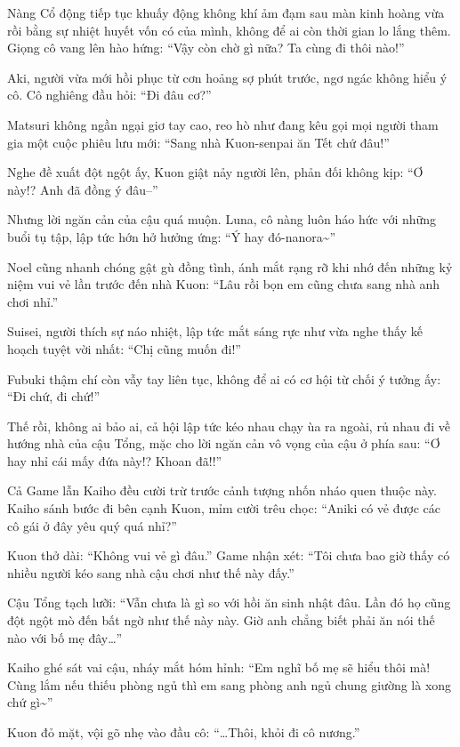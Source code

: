 \documentclass[../main.tex]{subfiles}
\begin{document}
Nàng Cổ động tiếp tục khuấy động không khí ảm đạm sau màn kinh hoàng vừa rồi bằng sự nhiệt huyết vốn có của mình, không để ai còn thời gian lo lắng thêm. Giọng cô vang lên hào hứng: ``Vậy còn chờ gì nữa? Ta cùng đi thôi nào!''

Aki, người vừa mới hồi phục từ cơn hoảng sợ phút trước, ngơ ngác không hiểu ý cô. Cô nghiêng đầu hỏi: ``Đi đâu cơ?''

Matsuri không ngần ngại giơ tay cao, reo hò như đang kêu gọi mọi người tham gia một cuộc phiêu lưu mới: ``Sang nhà Kuon-senpai ăn Tết chứ đâu!''

Nghe đề xuất đột ngột ấy, Kuon giật nảy người lên, phản đối không kịp: ``Ơ này!? Anh đã đồng ý đâu--''

Nhưng lời ngăn cản của cậu quá muộn. Luna, cô nàng luôn háo hức với những buổi tụ tập, lập tức hớn hở hưởng ứng: ``Ý hay đó-nanora\~{}''

Noel cũng nhanh chóng gật gù đồng tình, ánh mắt rạng rỡ khi nhớ đến những kỷ niệm vui vẻ lần trước đến nhà Kuon: ``Lâu rồi bọn em cũng chưa sang nhà anh chơi nhỉ.''

Suisei, người thích sự náo nhiệt, lập tức mắt sáng rực như vừa nghe thấy kế hoạch tuyệt vời nhất: ``Chị cũng muốn đi!''

Fubuki thậm chí còn vẫy tay liên tục, không để ai có cơ hội từ chối ý tưởng ấy: ``Đi chứ, đi chứ!''

Thế rồi, không ai bảo ai, cả hội lập tức kéo nhau chạy ùa ra ngoài, rủ nhau đi về hướng nhà của cậu Tổng, mặc cho lời ngăn cản vô vọng của cậu ở phía sau: ``Ơ hay nhỉ cái mấy đứa này!? Khoan đã!!''

Cả Game lẫn Kaiho đều cười trừ trước cảnh tượng nhốn nháo quen thuộc này. Kaiho sánh bước đi bên cạnh Kuon, mỉm cười trêu chọc: ``Aniki có vẻ được các cô gái ở đây yêu quý quá nhỉ?''

Kuon thở dài: ``Không vui vẻ gì đâu.'' Game nhận xét: ``Tôi chưa bao giờ thấy có nhiều người kéo sang nhà cậu chơi như thế này đấy.''

Cậu Tổng tạch lưỡi: ``Vẫn chưa là gì so với hồi ăn sinh nhật đâu. Lần đó họ cũng đột ngột mò đến bất ngờ như thế này này. Giờ anh chẳng biết phải ăn nói thế nào với bố mẹ đây\dots''

Kaiho ghé sát vai cậu, nháy mắt hóm hỉnh: ``Em nghĩ bố mẹ sẽ hiểu thôi mà! Cùng lắm nếu thiếu phòng ngủ thì em sang phòng anh ngủ chung giường là xong chứ gì\~{}''

Kuon đỏ mặt, vội gõ nhẹ vào đầu cô: ``\dots Thôi, khỏi đi cô nương.''
\end{document}
